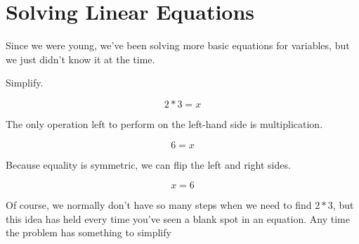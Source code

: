 \chapter{Solving Linear Equations}

Since we were young, we've been solving more basic equations for variables, but we just didn't know it at the time.

\begin{example}
Simplify.

$$2*3 = x$$

The only operation left to perform on the left-hand side is multiplication.

$$6 = x$$

Because equality is symmetric, we can flip the left and right sides.

$$x = 6$$
\end{example}

Of course, we normally don't have so many steps when we need to find $2*3$, but this idea has held every time you've seen a blank spot in an equation.  Any time the problem has something to simplify 
